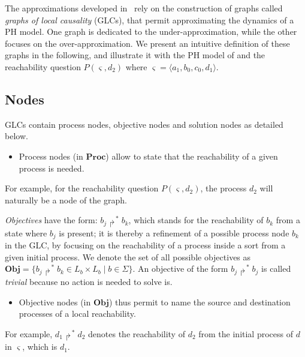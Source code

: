 \documentclass{movep}
\def\pref{\prettyref}
\newcommand{\PHs}{\Sigma}
\newcommand{\PHl}{L}
\newcommand{\Proc}{\mathbf{Proc}}
\newcommand{\PHfrappeB}{\Rsh}
\newcommand{\PHobjectif}[2]{\mbox{$#1\PHfrappeB^*\!#2$}}
\newcommand{\PHobj}{\PHobjectif}
\def\Obj{\mathbf{Obj}}
\def\ctx{\varsigma}
\newcommand{\Pcai}{P(\ctx, a_i)}
\newcommand{\PHetat}[1]{\mbox{$\langle #1 \rangle$}}
\def\ctx{\varsigma}
\newcounter{la}
\begin{document}
The approximations developed in~\cite{PMR12-MSCS,FPMR13-CS2Bio}
rely on the construction of graphs called
\emph{graphs of local causality} (GLCs),
that permit approximating the dynamics of a PH model.
One graph is dedicated to the under-approximation, while the other focuses on the over-approximation.
We present an intuitive definition of these graphs in the following,
and illustrate it with the PH model of \pref{fig:ph} and
the reachability question $P(\ctx, d_2)$ where $\ctx = \PHetat{a_1,b_0,c_0,d_1}$.

\subsection{Nodes}

GLCs contain process nodes, objective nodes and solution nodes as detailed below.

\begin{itemize}
  \item
Process nodes (in $\Proc$) allow to state that the reachability of a given process is needed.
\end{itemize}
For example, for the reachability question $P(\ctx, d_2)$, the process $d_2$ will naturally be a node
of the graph.

\emph{Objectives} have the form: $\PHobj{b_j}{b_k}$, which stands for the reachability
of $b_k$ from a state where $b_j$ is present;
it is thereby a refinement of a possible process node $b_k$ in the GLC, by focusing
on the reachability of a process inside a sort from a given initial process.
We denote the set of all possible objectives as
$\Obj = \{ \PHobj{b_j}{b_k} \in \PHl_b \times \PHl_b \mid b \in \PHs \}$.
An objective of the form $\PHobj{b_j}{b_j}$ is called \emph{trivial}
because no action is needed to solve is.
\begin{itemize}
\item
Objective nodes (in $\Obj$) thus permit to name the source and destination processes of a local reachability.
\end{itemize}
For example, $\PHobj{d_1}{d_2}$ denotes the reachability of $d_2$ from
the initial process of $d$ in $\ctx$, which is $d_1$.
\end{document}
